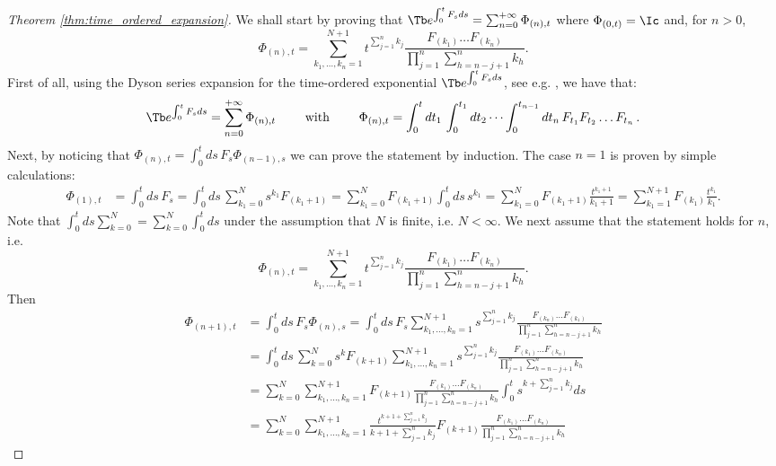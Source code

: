 \begin{proof}[Theorem \ref{thm:time_ordered_expansion}]
    We shall start by proving that $\Tb e^{\int_0^t F_s ds} = \sum_{n=0}^{+\infty} \Phi_{(n),t}$ where $\Phi_{(0,t)} = \Ic$ and, for $n>0$, \[\Phi_{(n),t} = \sum_{k_1,\dots,k_n=1}^{N+1} t^{\sum_{j=1}^n k_j} \frac{ F_{(k_1)} \dots F_{(k_n)}}{\prod_{j=1}^n \sum_{h=n-j+1}^n k_h}.\]
    First of all, using the Dyson series expansion for the time-ordered exponential $\Tb e^{\int_0^t F_s ds}$, see e.g. \cite{Dyson, argeri2014magnus, sakurai2020modern}, we have that: 
    \[\Tb e^{\int_0^t F_s ds} = \sum_{n=0}^{+\infty} \Phi_{(n),t} \qquad\text{ with }\qquad 
    \Phi_{(n),t} = \int_0^t dt_1\, \int_0^{t_1} dt_2\, \dots \int_0^{t_{n-1}} dt_n\, F_{t_1}F_{t_2}\dots F_{t_n}\,    .\]
    Next, by noticing that \(\Phi_{(n),t} = \int_0^t ds\, F_{s} \Phi_{(n-1),s} \) we can prove the statement by induction.
    The case $n=1$ is proven by simple calculations:
    \begin{align*}
        \Phi_{(1),t} &= \int_0^t ds\, F_{s}  = \int_0^t ds\, \sum_{k_1=0}^N s^{k_1}F_{(k_1+1)} = \sum_{k_1=0}^{N} F_{(k_1+1)} \int_0^t ds\, s^{k_1}  
        = \sum_{k_1=0}^{N} F_{(k_1+1)} \frac{t^{k_1+1}}{k_1+1} 
         = \sum_{k_1=1}^{N+1} F_{(k_1)} \frac{t^{k_1}}{k_1}.
    \end{align*}
    Note that $\int_0^t ds \sum_{k=0}^N = \sum_{k=0}^{N} \int_0^t ds$ under the assumption that $N$ is finite, i.e. $N<\infty$. 
    We next assume that the statement holds for $n$, i.e. 
    \[\Phi_{(n),t} = \sum_{k_1,\dots,k_n=1}^{N+1} t^{\sum_{j=1}^n k_j} \frac{F_{(k_1)}\dots F_{(k_n)}}{\prod_{j=1}^n \sum_{h=n-j+1}^n k_h}.\]
    Then 
    \begin{align*}
        \Phi_{(n+1),t} &= \int_0^t ds\, F_s \Phi_{(n),s} 
        = \int_0^t ds\, F_s \sum_{k_1,\dots,k_n=1}^{N+1} s^{\sum_{j=1}^n k_j} \frac{ F_{(k_n)}\dots F_{(k_1)}}{\prod_{j=1}^n \sum_{h=n-j+1}^n k_h} \\
        &= \int_0^t ds\, \sum_{k=0}^{N} s^k F_{(k+1)} \sum_{k_1,\dots,k_n=1}^{N+1}  s^{\sum_{j=1}^n k_j} \frac{ F_{(k_1)} \dots F_{(k_n)}}{\prod_{j=1}^n \sum_{h=n-j+1}^n k_h} \\
        &= \sum_{k=0}^{N} \sum_{k_1,\dots,k_n=1}^{N+1} F_{(k+1)} \frac{ F_{(k_1)}\dots F_{(k_n)}}{\prod_{j=1}^n \sum_{h=n-j+1}^n k_h}  \int_0^t s^{k+\sum_{j=1}^n k_j} ds \\
        &= \sum_{k=0}^{N} \sum_{k_1,\dots,k_n=1}^{N+1} \frac{t^{k+1+\sum_{j=1}^n k_j}}{k+1+\sum_{j=1}^n k_j} F_{(k+1)} \frac{F_{(k_1)}\dots F_{(k_n)}}{\prod_{j=1}^n \sum_{h=n-j+1}^n k_h}

\end{align*}
\end{proof}
